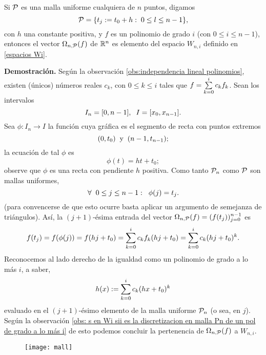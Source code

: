 \begin{prop} \label{Obs1}
Si $\mathcal{P}$ es una malla
uniforme cualquiera de $n$ puntos, digamos
\[
\mathcal{P}= \{ t_{j}:= t_{0}+h :\hspace{0.1cm} 0 \leq l \leq n-1 \},
\]
con $h$ una constante positiva, 
y $f$ es un polinomio de grado $i$
(con $0 \leq i \leq n-1$),
entonces el vector $\Omega_{n, \mathcal{P}}(f)$ de $\mathbb{R}^{n}$ 
es elemento del espacio $W_{n,i}$ definido en 
\eqref{espacios Wi}.
\end{prop}
\noindent
\textbf{Demostración.}
Según la observación \ref{obs:independencia lineal polinomios},
existen 
(únicos) números reales $c_{k}$, con $0 \leq k \leq i$
tales que 
$f= \sum\limits_{k=0}^{i}c_{k}f_{k}$.
Sean los intervalos
\[
I_{n}=[0,n-1], \hspace{0.2cm} I=[x_{0}, x_{n-1}].
\]
Sea $\phi:I_{n} \longrightarrow I$ la función cuya gráfica
es el segmento de recta con puntos extremos 
\[
(0, t_{0}) \hspace{0.2cm} \text{y} \hspace{0.2cm}
(n-1, t_{n-1});
\]
la ecuación de tal $\phi$ es
\[
\phi(t)=ht+t_{0};
\] observe que $\phi$
es una recta con pendiente $h$ positiva.
Como tanto
$\mathcal{P}_{n}$ como $\mathcal{P}$
son mallas uniformes, 
\[
\forall \hspace{0.2cm} 0 \leq j \leq n-1: \hspace{0.2cm} \phi(j)=t_{j}.
\] 
(para convencerse de que esto ocurre
basta aplicar un argumento de semejanza de triángulos).
\noindent Así, la $(j+1)$-ésima entrada del
vector $\Omega_{n, \mathcal{P}}(f)=(f(t_{j}))_{j=0}^{n-1}$ es
\[
f(t_{j})= f (\phi (j))=
f(hj+t_{0})=
\sum\limits_{k=0}^{i}c_{k}f_{k}(hj+t_{0})
= \sum\limits_{k=0}^{i}c_{k}(hj+t_{0})^{k}.
\]
Reconocemos al lado derecho de la igualdad como un polinomio
de grado a lo más $i$, a saber,
\[
h(x):= \sum\limits_{k=0}^{i}c_{k}(hx+t_{0})^{k}
\]
evaluado en el $(j+1)$-ésimo elemento 
de la malla uniforme $\mathcal{P}_{n}$
(o sea, en $j$). Según la observación
\ref{obs: s en Wi sii es la discretizacion en malla Pn de un pol de grado a lo más i}
de esto podemos concluir la pertenencia de 
$\Omega_{n, \mathcal{P}}(f)$ a $W_{n,i}$. \\

\begin{figure}[H]
    \texttt{[image: mall]} 
 \end{figure}
\QEDB
\vspace{0.2cm}

